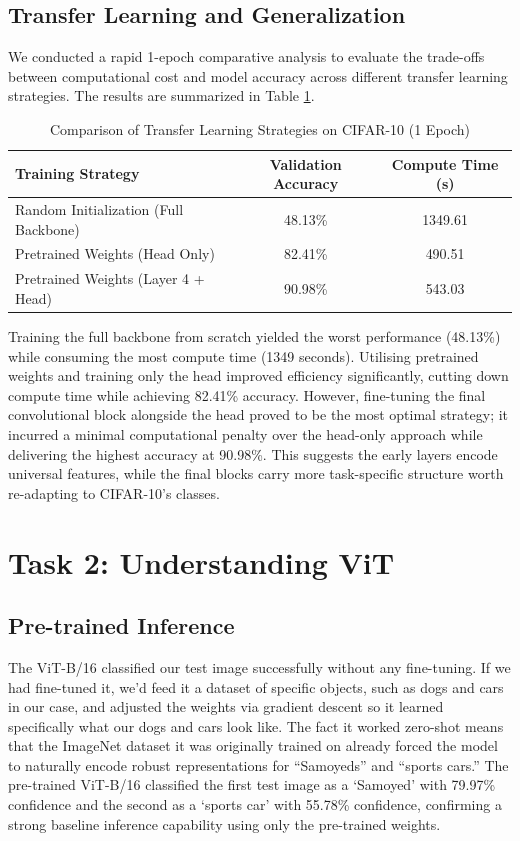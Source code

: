 \documentclass{article}
\begin{document}
    \subsection{Transfer Learning and Generalization}
    We conducted a rapid 1-epoch comparative analysis to evaluate the trade-offs between computational cost and model accuracy across different transfer learning strategies. The results are summarized in Table \ref{tab:transfer_learning}.
    
    \begin{table}[h]
      \caption{Comparison of Transfer Learning Strategies on CIFAR-10 (1 Epoch)}
      \label{tab:transfer_learning}
      \centering
      \begin{tabular}{lcc}
        \toprule
        Training Strategy & Validation Accuracy & Compute Time (s) \\
        \midrule
        Random Initialization (Full Backbone) & 48.13\% & 1349.61 \\
        Pretrained Weights (Head Only) & 82.41\% & 490.51 \\
        Pretrained Weights (Layer 4 + Head) & 90.98\% & 543.03 \\
        \bottomrule
      \end{tabular}
    \end{table}
    
    Training the full backbone from scratch yielded the worst performance (48.13\%) while consuming the most compute time (1349 seconds). Utilising pretrained weights and training only the head improved efficiency significantly, cutting down compute time while achieving 82.41\% accuracy. However, fine-tuning the final convolutional block alongside the head proved to be the most optimal strategy; it incurred a minimal computational penalty over the head-only approach while delivering the highest accuracy at 90.98\%. This suggests the early layers encode universal features, while the final blocks carry more task-specific structure worth re-adapting to CIFAR-10's classes.
    
    \section{Task 2: Understanding ViT}
    
    \subsection{Pre-trained Inference}
    The ViT-B/16 classified our test image successfully without any fine-tuning. If we had fine-tuned it, we'd feed it a dataset of specific objects, such as dogs and cars in our case, and adjusted the weights via gradient descent so it learned specifically what our dogs and cars look like. The fact it worked zero-shot means that the ImageNet dataset it was originally trained on already forced the model to naturally encode robust representations for ``Samoyeds'' and ``sports cars.'' The pre-trained ViT-B/16 classified the first test image as a `Samoyed' with 79.97\% confidence and the second as a `sports car' with 55.78\% confidence, confirming a strong baseline inference capability using only the pre-trained weights.
    
\end{document}
